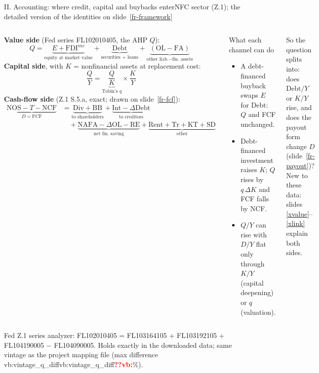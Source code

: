 \documentclass[aspectratio=169,10pt,t]{beamer}
\newcommand{\vget}[2]{\ifcsname #1:#2\endcsname\csname #1:#2\endcsname\else\textcolor{red}{\textbf{??#1:\detokenize{#2}}}\fi}
\newcommand{\vb}[1]{\vget{vb}{#1}}%
\newcommand{\src}[1]{\vfill{\tiny\textcolor{muted}{#1}\par}\vspace{0.04cm}}
\newcommand{\slref}[1]{slide~\ref{#1}}
\begin{document}
\begin{frame}[label=fr-acct]{II. Accounting: where credit, capital and buybacks enter}{NFC sector (Z.1); the detailed version of the identities on \slref{fr-framework}}
\begin{columns}[T]
{\small\textbf{Value side} (Fed series FL102010405, the AHP $Q$):}
{\footnotesize\[
Q=\underbrace{E+\mathrm{FDI}^{mv}}_{\text{equity at market value}}+\underbrace{\mathrm{Debt}}_{\text{securities + loans}}+\underbrace{(\mathrm{OL}-\mathrm{FA})}_{\text{other liab.} - \text{fin. assets}}
\]}
{\small\textbf{Capital side}, with $K$ = nonfinancial assets at replacement cost:}
{\footnotesize\[
\frac{Q}{Y}=\underbrace{\frac{Q}{K}}_{\text{Tobin's }q}\times\frac{K}{Y}
\]}
{\small\textbf{Cash-flow side} (Z.1 S.5.a, exact; drawn on \slref{fr-fcf}):}
{\scriptsize\begin{align*}
\underbrace{\mathrm{NOS}-T-\mathrm{NCF}}_{D=\mathrm{FCF}}&=\underbrace{\mathrm{Div}+\mathrm{BB}}_{\text{to shareholders}}+\underbrace{\mathrm{Int}-\Delta\mathrm{Debt}}_{\text{to creditors}}\\[-0.1cm]
&\quad+\underbrace{\mathrm{NAFA}-\Delta\mathrm{OL}-\mathrm{RE}}_{\text{net fin.\ saving}}+\underbrace{\mathrm{Rent}+\mathrm{Tr}+\mathrm{KT}+\mathrm{SD}}_{\text{other}}
\end{align*}}
\begin{block}{What each channel can do}
\small
\begin{itemize}\setlength{\itemsep}{0.08cm}
\item A debt-financed buyback swaps $E$ for Debt: $Q$ and FCF unchanged.
\item Debt-financed investment raises $K$; $Q$ rises by $q\,\Delta K$ and FCF falls by NCF.
\item $Q/Y$ can rise with $D/Y$ flat only through $K/Y$ (capital deepening) or $q$ (valuation).
\end{itemize}
\end{block}
\vspace{0.12cm}
{\scriptsize So the question splits into: does $\mathrm{Debt}/Y$ or $K/Y$ rise, and does the payout form change $D$ (\slref{fr-payout})? \textcolor{inksec}{New to these data: slides \ref{xvalue}--\ref{xlink} explain both sides.}\par}
\end{columns}
\src{Fed Z.1 series analyzer: FL102010405 = FL103164105 + FL103192105 + FL104190005 $-$ FL104090005. Holds exactly in the downloaded data; same vintage as the project mapping file (max difference \vb{vintage_q_diff}\%).}
\end{frame}
\end{document}
